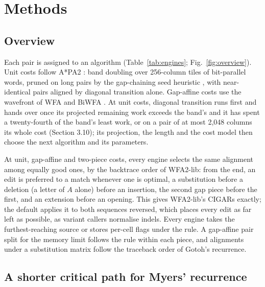 \section{Methods}

\subsection{Overview}

Each pair is assigned to an algorithm (Table~\ref{tab:engines}; Fig.~\ref{fig:overview}). Unit costs follow A*PA2 \citep{GrootKoerkamp2024astarpa2}: band doubling over 256-column tiles of bit-parallel words, pruned on long pairs by the gap-chaining seed heuristic \citep{GrootKoerkamp2024astarpa}, with near-identical pairs aligned by diagonal transition alone. Gap-affine costs use the wavefront of WFA and BiWFA \citep{MarcoSola2021wfa,MarcoSola2023biwfa}. At unit costs, diagonal transition runs first and hands over once its projected remaining work exceeds the band's and it has spent a twenty-fourth of the band's least work, or on a pair of at most 2{,}048 columns its whole cost (Section 3.10); its projection, the length and the cost model then choose the next algorithm and its parameters.

At unit, gap-affine and two-piece costs, every engine selects the same alignment among equally good ones, by the backtrace order of WFA2-lib: from the end, an edit is preferred to a match whenever one is optimal, a substitution before a deletion (a letter of \(A\) alone) before an insertion, the second gap piece before the first, and an extension before an opening. This gives WFA2-lib's CIGARs exactly; the default applies it to both sequences reversed, which places every edit as far left as possible, as variant callers normalise indels. Every engine takes the furthest-reaching source or stores per-cell flags under the rule. A gap-affine pair split for the memory limit follows the rule within each piece, and alignments under a substitution matrix follow the traceback order of Gotoh's recurrence.





\subsection{A shorter critical path for Myers' recurrence}

